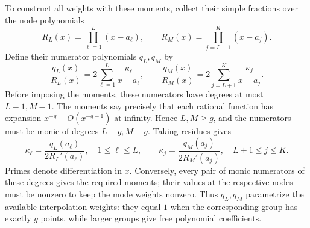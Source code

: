 To construct all weights with these moments, collect their simple
fractions over the node polynomials
\begin{equation}\label{eq:BA-node-polynomials}
 R_L(x)=\prod_{\ell=1}^{L}(x-a_{\ell}),\qquad
 R_M(x)=\prod_{j=L+1}^{K}(x-a_j).
\end{equation}
Define their numerator polynomials $q_L,q_M$ by
\begin{equation}\label{eq:BA-weight-generating}
 \frac{q_L(x)}{R_L(x)}
 =2\sum_{\ell=1}^{L}\frac{\kappa_{\ell}}{x-a_{\ell}},\qquad
 \frac{q_M(x)}{R_M(x)}
 =2\sum_{j=L+1}^{K}\frac{\kappa_j}{x-a_j}.
\end{equation}
Before imposing the moments, these numerators have degrees at most
$L-1,M-1$. The moments say precisely that each rational function has expansion
$x^{-g}+O(x^{-g-1})$ at infinity. Hence $L,M\geq g$, and the
numerators must be monic of degrees $L-g,M-g$. Taking residues gives
\begin{equation}\label{eq:BA-residue-weights}
 \kappa_{\ell}=\frac{q_L(a_{\ell})}{2R_L'(a_{\ell})},
 \quad1\leq\ell\leq L,\qquad
 \kappa_j=\frac{q_M(a_j)}{2R_M'(a_j)},
 \quad L+1\leq j\leq K.
\end{equation}
Primes denote differentiation in $x$. Conversely, every pair of
monic numerators of these degrees gives the required moments;
their values at the respective nodes must be nonzero to keep the
mode weights nonzero. Thus $q_L,q_M$
parametrize the available interpolation weights: they equal $1$
when the corresponding group has exactly $g$ points, while larger
groups give free polynomial coefficients.

